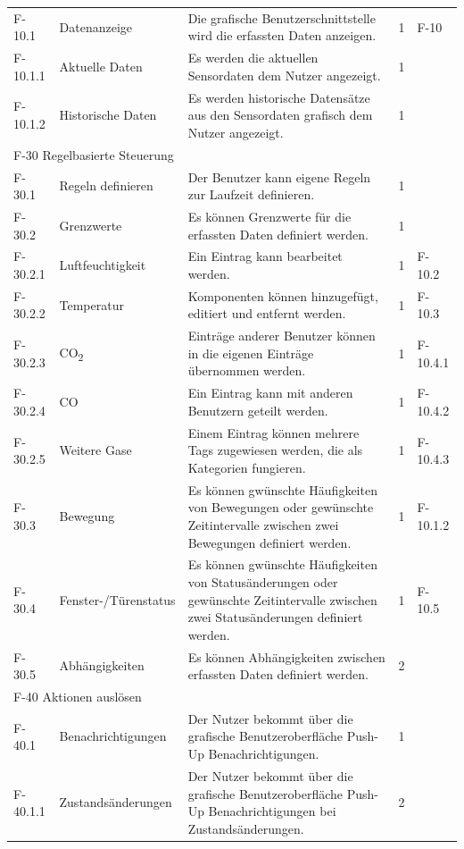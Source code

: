\begin{tabularx}{\textwidth}{|l|X|X|l|l|}
    \hline
    F-10.1   & Datenanzeige & Die grafische Benutzerschnittstelle wird die erfassten Daten anzeigen. & 1 & F-10\\
    F-10.1.1 & Aktuelle Daten & Es werden die aktuellen Sensordaten dem Nutzer angezeigt. & 1 & \\
    F-10.1.2 & Historische Daten & Es werden historische Datensätze aus den Sensordaten grafisch dem Nutzer angezeigt. & 1 & \\
    \hline
    \multicolumn{5}{|l|}{F-30 Regelbasierte Steuerung}\\
    \hline
    F-30.1 & Regeln definieren & Der Benutzer kann eigene Regeln zur Laufzeit definieren. & 1 & \\
    F-30.2 & Grenzwerte & Es können Grenzwerte für die erfassten Daten definiert werden. & 1 & \\
    F-30.2.1 & Luftfeuchtigkeit & Ein Eintrag kann bearbeitet werden. & 1 & F-10.2\\
    F-30.2.2 & Temperatur & Komponenten können hinzugefügt, editiert und entfernt werden. & 1 & F-10.3\\
    F-30.2.3 & CO\textsubscript{2}& Einträge anderer Benutzer können in die eigenen Einträge übernommen werden. & 1 & F-10.4.1\\
    F-30.2.4 & CO & Ein Eintrag kann mit anderen Benutzern geteilt werden. & 1 & F-10.4.2\\
    F-30.2.5 & Weitere Gase & Einem Eintrag können mehrere Tags zugewiesen werden, die als Kategorien fungieren. & 1 & F-10.4.3\\
    F-30.3 & Bewegung & Es können gwünschte Häufigkeiten von Bewegungen oder gewünschte Zeitintervalle zwischen zwei Bewegungen definiert werden. & 1 & F-10.1.2\\
    F-30.4 & Fenster-/Türenstatus & Es können gwünschte Häufigkeiten von Statusänderungen oder gewünschte Zeitintervalle zwischen zwei Statusänderungen definiert werden. & 1 & F-10.5\\
    F-30.5 & Abhängigkeiten & Es können Abhängigkeiten zwischen erfassten Daten definiert werden. & 2 & \\
    \hline
    \multicolumn{5}{|l|}{F-40 Aktionen auslösen}\\
    \hline
    F-40.1 & Benachrichtigungen & Der Nutzer bekommt über die grafische Benutzeroberfläche Push-Up Benachrichtigungen. & 1 & \\
    F-40.1.1 & Zustandsänderungen & Der Nutzer bekommt über die grafische Benutzeroberfläche Push-Up Benachrichtigungen bei Zustandsänderungen. & 2 & \\

\end{tabularx}
